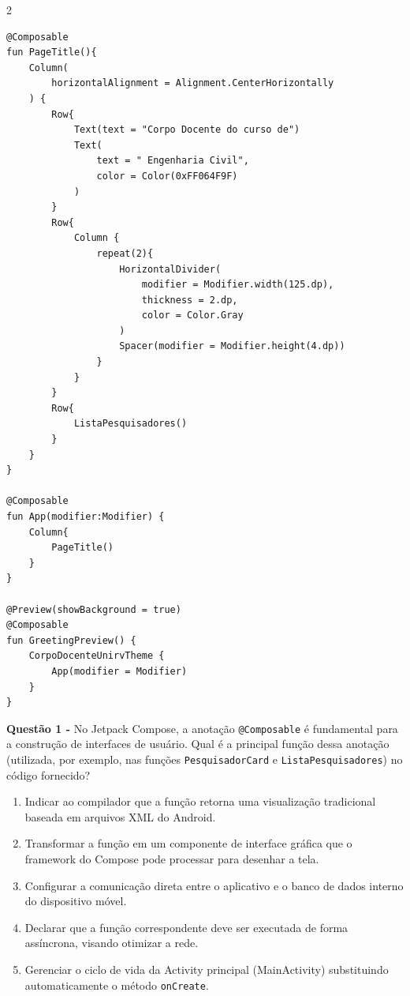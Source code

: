 \documentclass[12pt,a4paper]{article}
\begin{document}
\begin{multicols}{2}
\begin{lstlisting}[basicstyle=\scriptsize\ttfamily, breaklines=true]
@Composable
fun PageTitle(){
    Column(
        horizontalAlignment = Alignment.CenterHorizontally
    ) {
        Row{
            Text(text = "Corpo Docente do curso de")
            Text(
                text = " Engenharia Civil",
                color = Color(0xFF064F9F)
            )
        }
        Row{
            Column {
                repeat(2){
                    HorizontalDivider(
                        modifier = Modifier.width(125.dp),
                        thickness = 2.dp,
                        color = Color.Gray
                    )
                    Spacer(modifier = Modifier.height(4.dp))
                }
            }
        }
        Row{
            ListaPesquisadores()
        }
    }
}

@Composable
fun App(modifier:Modifier) {
    Column{
        PageTitle()
    }
}

@Preview(showBackground = true)
@Composable
fun GreetingPreview() {
    CorpoDocenteUnirvTheme {
        App(modifier = Modifier)
    }
}
\end{lstlisting}
\end{multicols}

\vspace{0.5cm}

\textbf{Questão 1 - } No Jetpack Compose, a anotação \texttt{@Composable} é fundamental para a construção de interfaces de usuário. Qual é a principal função dessa anotação (utilizada, por exemplo, nas funções \texttt{PesquisadorCard} e \texttt{ListaPesquisadores}) no código fornecido?

\begin{enumerate}[label=\alph*)]
    \item Indicar ao compilador que a função retorna uma visualização tradicional baseada em arquivos XML do Android.
    \item Transformar a função em um componente de interface gráfica que o framework do Compose pode processar para desenhar a tela.
    \item Configurar a comunicação direta entre o aplicativo e o banco de dados interno do dispositivo móvel.
    \item Declarar que a função correspondente deve ser executada de forma assíncrona, visando otimizar a rede.
    \item Gerenciar o ciclo de vida da Activity principal (MainActivity) substituindo automaticamente o método \texttt{onCreate}.
\end{enumerate}

\vspace{0.5cm}
\end{document}
